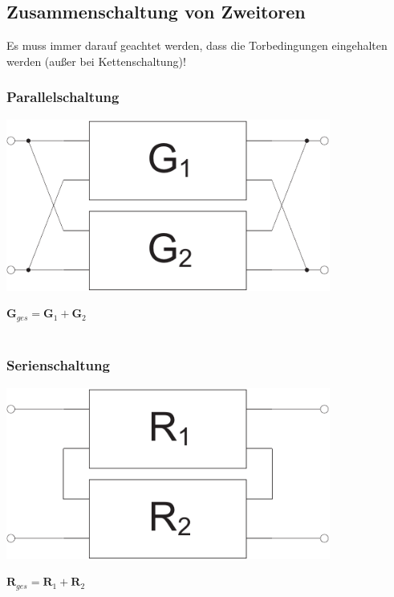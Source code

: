 \documentclass[a4paper,twocolumn,10pt]{article}
\begin{document}
\subsection*{Zusammenschaltung von Zweitoren}
Es muss immer darauf geachtet werden, dass die Torbedingungen eingehalten werden (außer bei Kettenschaltung)!
\subsubsection*{Parallelschaltung}
\begin{minipage}[b]{0.23\textwidth}
\includegraphics[width=0.8\textwidth]{Grafiken/Zweitor_Parallel}
\end{minipage}
\hfill
\begin{minipage}[b]{0.23\textwidth}
$\textbf{G}_{ges}=\textbf{G}_1+\textbf{G}_2$\\\\
\end{minipage}

\subsubsection*{Serienschaltung}
\begin{minipage}[b]{0.23\textwidth}
\includegraphics[width=0.8\textwidth]{Grafiken/Zweitor_Seriell}
\end{minipage}
\hfill
\begin{minipage}[b]{0.23\textwidth}
$\textbf{R}_{ges}=\textbf{R}_1+\textbf{R}_2$\\\\
\end{minipage}
\end{document}
